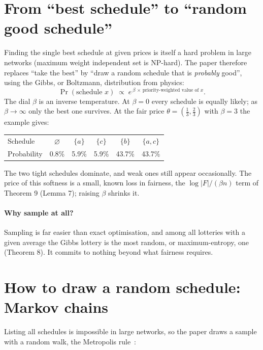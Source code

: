\documentclass[11pt,a4paper]{article}
\begin{document}
\section{From ``best schedule'' to ``random good schedule''}

Finding the single best schedule at given prices is itself a hard problem in large networks (maximum
weight independent set is NP-hard). The paper therefore replaces ``take the best'' by ``draw a random
schedule that is \emph{probably} good'', using the Gibbs, or Boltzmann, distribution from physics:
\[
\Pr(\text{schedule } x)\;\propto\;e^{\,\beta\,\times\,\text{priority-weighted value of }x}.
\]
The dial $\beta$ is an inverse temperature. At $\beta=0$ every schedule is equally likely; as
$\beta\to\infty$ only the best one survives. At the fair price $\theta=(\tfrac13,\tfrac23)$ with $\beta=3$
the example gives:
\begin{center}\small
\begin{tabular}{@{}lccccc@{}}
\toprule
Schedule & $\varnothing$ & $\{a\}$ & $\{c\}$ & $\{b\}$ & $\{a,c\}$\\
Probability & 0.8\% & 5.9\% & 5.9\% & 43.7\% & 43.7\%\\
\bottomrule
\end{tabular}
\end{center}
The two tight schedules dominate, and weak ones still appear occasionally. The price of this softness is
a small, known loss in fairness, the $\log|F|/(\beta n)$ term of Theorem 9 (Lemma 7); raising $\beta$
shrinks it.

\paragraph{Why sample at all?} Sampling is far easier than exact optimisation, and among all lotteries
with a given average the Gibbs lottery is the most random, or maximum-entropy, one (Theorem 8). It commits
to nothing beyond what fairness requires.

\section{How to draw a random schedule: Markov chains}

Listing all schedules is impossible in large networks, so the paper draws a sample with a random walk,
the Metropolis rule~\cite{metropolis,hastings}:
\end{document}
